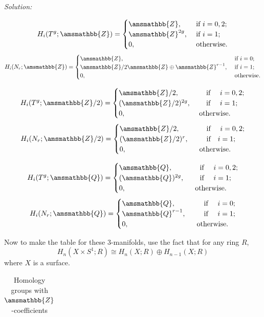 \documentclass[a4paper, 12pt]{article}
\newenvironment{solution}
    {\textit{Solution:}}
    {}
\renewcommand{\mathbb}{\amsmathbb}
\newcommand{\iif}{\ \ \ \text{if}\ \ \ }
\begin{document}
\begin{solution}
\begin{enumerate}[(a)]
\begin{multicols}{2}
\[H_i(T^g;\mathbb{Z})=\begin{cases}
    \mathbb{Z},&\ \text{if}\ i=0,2;\\
    \mathbb{Z}^{2g},&\ \text{if}\ i=1;\\ 
    0,&\ \text{otherwise}. 
\end{cases}\]
\[H_i(N_r;\mathbb{Z})=\begin{cases}
    \mathbb{Z},&\ \text{if}\ i=0;\\ 
    \mathbb{Z}/2 \mathbb{Z}\oplus \mathbb{Z}^{r-1},&\ \text{if}\ i=1;\\ 
    0,&\ \text{otherwise}.
\end{cases}\]
\end{multicols}
\begin{multicols}{2}
\noindent 
\[H_i(T^g;\mathbb{Z}/2)=\begin{cases}
	\mathbb{Z}/2,&\ \iif\ i=0,2;\\ 
	(\mathbb{Z}/2)^{2g},&\ \iif \ i=1;\\ 
	0,&\ \text{otherwise}.
\end{cases}\]
\[H_i(N_r;\mathbb{Z}/2)=\begin{cases}
	\mathbb{Z}/2,&\ \ \iif\ i=0,2;\\ 
	(\mathbb{Z}/2)^r,&\ \ \iif i=1;\\ 
	0,&\ \ \text{otherwise}.
\end{cases}\]
\end{multicols}
\begin{multicols}{2}
\noindent 
\[H_i(T^g;\mathbb{Q})=\begin{cases}
	\mathbb{Q},&\ \iif \ i=0,2;\\ 
	(\mathbb{Q})^{2g},&\ \iif \ i=1;\\ 
	0,&\ \ \text{otherwise}.
\end{cases}\]
\[H_i(N_r;\mathbb{Q})=\begin{cases}
	\mathbb{Q},&\ \ \iif \ i=0;\\ 
	\mathbb{Q}^{r-1},&\ \ \iif\ i=1;\\ 
	0,&\ \ \text{otherwise}.
\end{cases}\]
\end{multicols}
Now to make the table for these 3-manifolds, use the fact that for any ring \(R\), 
\[H_n(X\times S^1;R)\cong H_n(X;R)\oplus H_{n-1}(X;R)\]
where \(X\) is a surface. 
\begin{table}[!h]
\begin{center}
\caption{Homology groups with \(\mathbb{Z}\)-coefficients}
\vspace{.1cm}
\begin{tabular}{|c||c|c|c|c|c|}

\end{tabular}
\end{center}
\end{table}
\end{enumerate}
\end{solution}
\end{document}
